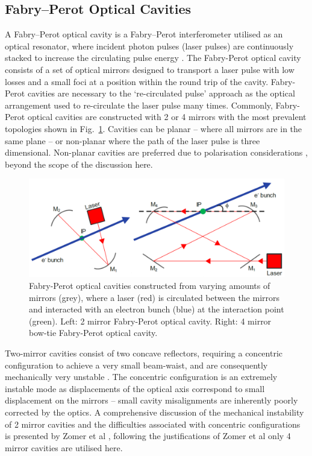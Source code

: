 \documentclass[../main.tex]{subfiles}
\begin{document}
\subsection{Fabry--Perot Optical Cavities}
\label{sec:fabry_perot_optical_cavities}

A Fabry--Perot optical cavity is a Fabry--Perot interferometer \cite{fabry1901new} utilised as an optical resonator, where incident photon pulses (laser pulses) are continuously stacked to increase the circulating pulse energy \cite{schawlow1958infrared,variola2011luminosity}.
The Fabry-Perot optical cavity consists of a set of optical mirrors designed to transport a laser pulse with low losses and a small foci at a position within the round trip of the cavity. Fabry-Perot cavities are necessary to the `re-circulated pulse' approach as the optical arrangement used to re-circulate the laser pulse many times. Commonly, Fabry-Perot optical cavities are constructed with 2 or 4 mirrors with the most prevalent topologies shown in Fig.~\ref{fig:2_mirror_4_mirror}. Cavities can be planar -- where all mirrors are in the same plane -- or non-planar where the path of the laser pulse is three dimensional. Non-planar cavities are preferred due to polarisation considerations \cite{zomer2009polarization}, beyond the scope of the discussion here.
\begin{figure}[!h]
\centering
\includegraphics[width=\textwidth]{Figures/Photon_Production_by_Inverse_Compton_Scattering/2_mirror_4_mirror.pdf}
\caption{Fabry-Perot optical cavities constructed from varying amounts of mirrors (grey), where a laser (red) is circulated between the mirrors and interacted with an electron bunch (blue) at the interaction point (green). Left: 2 mirror Fabry-Perot optical cavity. Right: 4 mirror bow-tie Fabry-Perot optical cavity.}
\label{fig:2_mirror_4_mirror}
\end{figure}

Two-mirror cavities consist of
two concave reflectors, requiring a concentric configuration to achieve a very small beam-waist, and are consequently mechanically very unstable \cite{dupraz2015abcd}. The concentric configuration is an extremely instable mode as displacements of the optical axis
correspond to small displacement on the mirrors \cite{variola2011luminosity} -- small cavity misalignments are inherently poorly corrected by the optics. A comprehensive discussion of the mechanical instability of 2 mirror cavities and the difficulties associated with concentric configurations is presented by Zomer et al \cite{zomer2009polarization}, following the justifications of Zomer et al only 4 mirror cavities are utilised here. 
\end{document}
